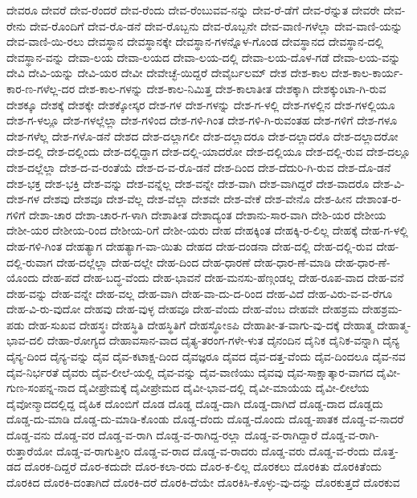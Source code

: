 ದೇವರೂ
ದೇವರೆ
ದೇವ-ರೆಂದರೆ
ದೇವ-ರೆಂದು
ದೇವ-ರೆಂಬುವವ-ನನ್ನು
ದೇವ-ರೆ-ಡೆಗೆ
ದೇವ-ರೆನ್ನುತ
ದೇವರೇ
ದೇವ-ರೇನು
ದೇವ-ರೊಂದಿಗೆ
ದೇವ-ರೊ-ಡನೆ
ದೇವ-ರೊಬ್ಬನು
ದೇವ-ರೊಬ್ಬನೇ
ದೇವ-ವಾಣಿ-ಗಳೆಲ್ಲಾ
ದೇವ-ವಾಣಿ-ಯನ್ನು
ದೇವ-ವಾಣಿ-ಯಿ-ರಲು
ದೇವಸ್ಥಾನ
ದೇವಸ್ಥಾನಕ್ಕೇ
ದೇವಸ್ಥಾನ-ಗಳನ್ನೊಳ-ಗೊಂಡ
ದೇವಸ್ಥಾನದ
ದೇವಸ್ಥಾನ-ದಲ್ಲಿ
ದೇವಸ್ಥಾನ-ವನ್ನು
ದೇವಾ-ಲಯ
ದೇವಾ-ಲಯದ
ದೇವಾ-ಲಯ-ದಲ್ಲಿ
ದೇವಾ-ಲಯ-ದೊಳ-ಗಡೆ
ದೇವಾ-ಲಯ-ವನ್ನು
ದೇವಿ
ದೇವಿ-ಯನ್ನು
ದೇವಿ-ಯರ
ದೇವೀ
ದೇವೇಚ್ಛೆ-ಯಿದ್ದರೆ
ದೇವೈರ್ಬಲಮ್
ದೇಶ
ದೇಶ-ಕಾಲ
ದೇಶ-ಕಾಲ-ಕಾರ್ಯ-ಕಾರ-ಣ-ಗಳೆಲ್ಲ-ದರ
ದೇಶ-ಕಾಲ-ಗಳನ್ನು
ದೇಶ-ಕಾಲ-ನಿಮಿತ್ತ
ದೇಶ-ಕಾಲಾತೀತ
ದೇಶಕ್ಕಾಗಿ
ದೇಶಕ್ಕುಂಟಾ-ಗಿ-ರುವ
ದೇಶಕ್ಕೂ
ದೇಶಕ್ಕೆ
ದೇಶಕ್ಕೇ
ದೇಶಕ್ಕೋಸ್ಕರ
ದೇಶ-ಗಳ
ದೇಶ-ಗಳನ್ನು
ದೇಶ-ಗ-ಳಲ್ಲಿ
ದೇಶ-ಗಳಲ್ಲಿನ
ದೇಶ-ಗಳಲ್ಲಿಯೂ
ದೇಶ-ಗ-ಳಲ್ಲೂ
ದೇಶ-ಗಳಲ್ಲೆಲ್ಲಾ
ದೇಶ-ಗಳಿಂದ
ದೇಶ-ಗಳಿ-ಗಿಂತ
ದೇಶ-ಗಳಿ-ಗಿ-ರುವಂತಹ
ದೇಶ-ಗಳಿಗೆ
ದೇಶ-ಗಳೂ
ದೇಶ-ಗಳೆಲ್ಲ
ದೇಶ-ಗಳೊ-ಡನೆ
ದೇಶದ
ದೇಶ-ದಲ್ಲಾಗಲೀ
ದೇಶ-ದಲ್ಲಾದರೂ
ದೇಶ-ದಲ್ಲಾದರೊ
ದೇಶ-ದಲ್ಲಾದರೋ
ದೇಶ-ದಲ್ಲಿ
ದೇಶ-ದಲ್ಲಿಂದು
ದೇಶ-ದಲ್ಲಿದ್ದಾಗ
ದೇಶ-ದಲ್ಲಿ-ಯಾದರೋ
ದೇಶ-ದಲ್ಲಿಯೂ
ದೇಶ-ದಲ್ಲಿ-ರುವ
ದೇಶ-ದಲ್ಲೂ
ದೇಶ-ದಲ್ಲೆಲ್ಲಾ
ದೇಶ-ದ-ವ-ರಂತೆಯೆ
ದೇಶ-ದ-ವ-ರೊ-ಡನೆ
ದೇಶ-ದಿಂದ
ದೇಶ-ದೆದುರಿ-ಗಿ-ರುವ
ದೇಶ-ದೊ-ಡನೆ
ದೇಶ-ಭಕ್ತ
ದೇಶ-ಭಕ್ತಿ
ದೇಶ-ವನ್ನು
ದೇಶ-ವನ್ನೆಲ್ಲ
ದೇಶ-ವನ್ನೇ
ದೇಶ-ವಾಗಿ
ದೇಶ-ವಾಗಿದ್ದರೆ
ದೇಶ-ವಾದರೊ
ದೇಶ-ವಿ-ದೇಶ-ಗಳ
ದೇಶವು
ದೇಶವೂ
ದೇಶ-ವೆಲ್ಲ
ದೇಶ-ವೆಲ್ಲಾ
ದೇಶವೇ
ದೇಶ-ವೇಕೆ
ದೇಶ-ವೇನೊ
ದೇಶ-ಹೀನ
ದೇಶಾಂತ-ರ-ಗಳಿಗೆ
ದೇಶಾ-ಚಾರ
ದೇಶಾ-ಚಾರ-ಗ-ಳಾಗಿ
ದೇಶಾತೀತ
ದೇಶಾದ್ಯಂತ
ದೇಶಾನು-ಸಾರ-ವಾಗಿ
ದೇಶಿ-ಯರ
ದೇಶೀಯ
ದೇಶೀ-ಯರ
ದೇಶೀಯ-ರಿಂದ
ದೇಶೀಯ-ರಿಗೆ
ದೇಶೀ-ಯರು
ದೇಹ
ದೇಹಕ್ಕಿಂತ
ದೇಹಕ್ಕಿ-ರ-ಲಿಲ್ಲ
ದೇಹಕ್ಕೆ
ದೇಹ-ಗ-ಳಲ್ಲಿ
ದೇಹ-ಗಳಿ-ಗಿಂತ
ದೇಹತ್ಯಾಗ
ದೇಹತ್ಯಾಗ-ವಾ-ಯಿತು
ದೇಹದ
ದೇಹ-ದಂಡನಾ
ದೇಹ-ದಲ್ಲಿ
ದೇಹ-ದಲ್ಲಿ-ರುವ
ದೇಹ-ದಲ್ಲಿ-ರುವಾಗ
ದೇಹ-ದಲ್ಲೆಲ್ಲಾ
ದೇಹ-ದಲ್ಲೇ
ದೇಹ-ದಿಂದ
ದೇಹ-ಧಾರಣೆ
ದೇಹ-ಧಾರ-ಣೆ-ಮಾಡಿ
ದೇಹ-ಧಾರ-ಣೆ-ಯೊಂದು
ದೇಹ-ಪದೆ
ದೇಹ-ಬದ್ಧ-ವೆಂದು
ದೇಹ-ಭಾವನೆ
ದೇಹ-ಮನಸು-ಹೆಣ್ಗಂಡಲ್ಲ
ದೇಹ-ರೂಪ-ವಾದ
ದೇಹ-ವನೆ
ದೇಹ-ವನ್ನು
ದೇಹ-ವನ್ನೇ
ದೇಹ-ವಲ್ಲ
ದೇಹ-ವಾಗಿ
ದೇಹ-ವಾ-ದು-ದ-ರಿಂದ
ದೇಹ-ವಿದೆ
ದೇಹ-ವಿರು-ವ-ವ-ರೆಗೂ
ದೇಹ-ವಿ-ರು-ವುದೋ
ದೇಹವು
ದೇಹ-ವುಳ್ಳ
ದೇಹವೂ
ದೇಹ-ವೆಂದು
ದೇಹ-ವೆಂಬ
ದೇಹವೇ
ದೇಹಶ್ರಮ
ದೇಹಶ್ರಮ-ಪಡು
ದೇಹ-ಸುಖವ
ದೇಹಸ್ಥಃ
ದೇಹಸ್ಥಿತಿ
ದೇಹಸ್ಥಿತಿಗೆ
ದೇಹಸ್ಥೋಽಪಿ
ದೇಹಾತೀ-ತ-ವಾಗು-ವು-ದಕ್ಕೆ
ದೇಹಾತ್ಮ
ದೇಹಾತ್ಮ-ಭಾವ-ದಲಿ
ದೇಹಾ-ರೋಗ್ಯದ
ದೇಹಾವಸಾನ-ವಾದ
ದೈತ್ಯ-ತರಂಗ-ಗಳೇ-ಳುತ
ದೈನಂದಿನ
ದೈನಿಕ
ದೈನಿಕ-ವನ್ನಾಗಿ
ದೈನ್ಯ
ದೈನ್ಯ-ದಿಂದ
ದೈನ್ಯ-ವನ್ನು
ದೈವ
ದೈವ-ಕಟಾಕ್ಷ-ದಿಂದ
ದೈವಜ್ಞರೂ
ದೈವದ
ದೈವ-ದತ್ತ-ವೆಂದು
ದೈವ-ದಿಂದಲೂ
ದೈವ-ನವ
ದೈವ-ನಿರ್ಭರತೆ
ದೈವರು
ದೈವ-ಲೀಲೆ-ಯಲ್ಲಿ
ದೈವ-ವನ್ನು
ದೈವ-ವಾಣಿಯು
ದೈವವು
ದೈವ-ಸಾಕ್ಷಾತ್ಕಾರ-ವಾಗದ
ದೈವೀ-ಗುಣ-ಸಂಪನ್ನ-ನಾದ
ದೈವೀಪ್ರೇಮಕ್ಕೆ
ದೈವೀಪ್ರೇಮದ
ದೈವೀ-ಭಾವ-ದಲ್ಲಿ
ದೈವೀ-ಮಾಯೆಯ
ದೈವೀ-ಲೀಲೆಯ
ದೈವೋನ್ಮಾದದಲ್ಲಿದ್ದ
ದೈಹಿಕ
ದೊಂಬಿಗೆ
ದೊಡ
ದೊಡ್ಡ
ದೊಡ್ಡ-ದಾಗಿ
ದೊಡ್ಡ-ದಾಗಿದೆ
ದೊಡ್ಡ-ದಾದ
ದೊಡ್ಡದು
ದೊಡ್ಡ-ದು-ಮಾಡಿ
ದೊಡ್ಡ-ದು-ಮಾಡಿ-ಕೊಂಡು
ದೊಡ್ಡ-ದೆಂದು
ದೊಡ್ಡ-ದೊಂದು
ದೊಡ್ಡ-ಪಾತಕ
ದೊಡ್ಡ-ವ-ನಾದರೆ
ದೊಡ್ಡ-ವನು
ದೊಡ್ಡ-ವರ
ದೊಡ್ಡ-ವ-ರಾಗಿ
ದೊಡ್ಡ-ವ-ರಾಗಿದ್ದ-ರಲ್ಲಾ
ದೊಡ್ಡ-ವ-ರಾಗಿದ್ದಾರೆ
ದೊಡ್ಡ-ವ-ರಾಗಿ-ರುತ್ತಾರೆಯೋ
ದೊಡ್ಡ-ವ-ರಾಗುತ್ತೀರಿ
ದೊಡ್ಡ-ವ-ರಾದ
ದೊಡ್ಡ-ವ-ರಾದರು
ದೊಡ್ಡ-ವರು
ದೊಡ್ಡ-ವ-ರೆಂದು
ದೊತ್ತ-ಡದ
ದೊರಕ-ದಿದ್ದರೆ
ದೊರ-ಕದುದೇ
ದೊರ-ಕಲಾ-ರದು
ದೊರ-ಕ-ಲಿಲ್ಲ
ದೊರಕಲು
ದೊರಕಿತು
ದೊರಕಿತೆಂದು
ದೊರಕಿದ
ದೊರಕಿ-ದಂತಾಗಿದೆ
ದೊರಕಿ-ದರೆ
ದೊರಕಿ-ದೆಯೇ
ದೊರಕಿಸಿ-ಕೊಳ್ಳು-ವು-ದನ್ನು
ದೊರಕುತ್ತದೆ
ದೊರಕುವ

